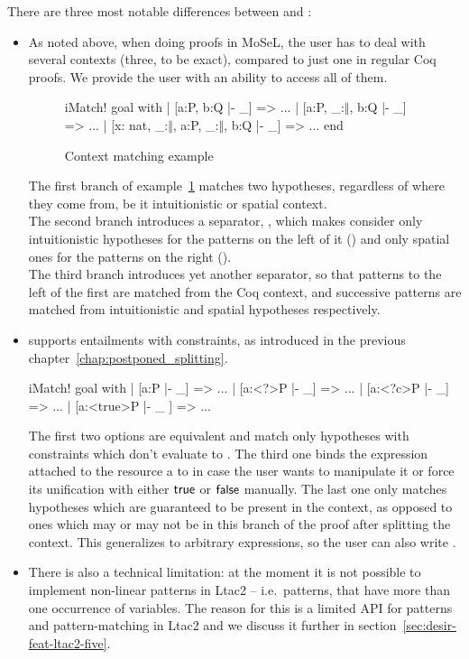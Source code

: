 There are three most notable differences between  and :
\begin{itemize}
\item As noted above, when doing proofs in MoSeL, the user has to deal with several contexts (three, to be exact), compared to just one in regular Coq proofs.
  We provide the user with an ability to access all of them.
  \begin{figure}[H]
  \begin{coq}
       iMatch! goal with
       | [a:P, b:Q |- _] => ...
       | [a:P, _:$\Vert$, b:Q |- _] => ...
       | [x: nat, _:$\Vert$, a:P, _:$\Vert$, b:Q |- _] => ...
       end
   \end{coq}
   \caption{Context matching example}
   \label{fig:example:contex_matching}
  \end{figure}
  The first branch of example~\ref{fig:example:contex_matching} matches two hypotheses, regardless of where they come from, be it intuitionistic or spatial context.\\
  The second branch introduces a separator, \coqe{_:$\Vert$}, which makes  consider only intuitionistic hypotheses for the patterns on the left of it () and only spatial ones for the patterns on the right ().\\
  The third branch introduces yet another separator, so that patterns to the left of the first \coqe{_:$\Vert$} are matched from the Coq context, and successive patterns are matched from intuitionistic and spatial hypotheses respectively.

\item {} supports entailments with constraints, as introduced in the previous chapter~\ref{chap:postponed_splitting}.
\begin{coq}
iMatch! goal with
| [a:P |- _] => ...
| [a:<?>P |- _] => ...
| [a:<?c>P |- _] => ...
| [a:<true>P |- _ ] => ...
\end{coq}
The first two options are equivalent and match only hypotheses with constraints which don't evaluate to \false.
The third one binds the expression attached to the resource a to  in case the user wants to manipulate it or force its unification with either $\textsf{true}$ or $\textsf{false}$ manually.
The last one only matches hypotheses which are guaranteed to be present in the context, as opposed to ones which may or may not be in this branch of the proof after splitting the context.
This generalizes to arbitrary expressions, so the user can also write .
\item There is also a technical limitation: at the moment it is not possible to implement non-linear patterns in Ltac2 -- i.e.\ patterns, that have more than one occurrence of variables.
  The reason for this is a limited API for patterns and pattern-matching in Ltac2 and we discuss it further in section~\ref{sec:desir-feat-ltac2-five}.


\end{itemize}
